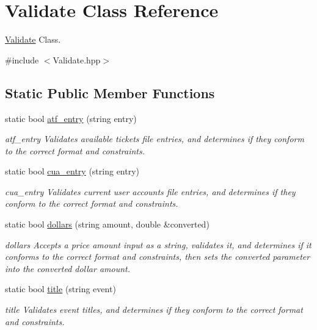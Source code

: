 \hypertarget{class_validate}{\section{Validate Class Reference}
\label{class_validate}
}


\hyperlink{class_validate}{Validate} Class.  




{\ttfamily \#include $<$Validate.\-hpp$>$}

\subsection*{Static Public Member Functions}
\begin{DoxyCompactItemize}
\item 
static bool \hyperlink{class_validate_a91df2ba52155e8442f2ce1461e2cdfdb}{atf\-\_\-entry} (string entry)
\begin{DoxyCompactList}\small\item\em atf\-\_\-entry Validates available tickets file entries, and determines if they conform to the correct format and constraints. \end{DoxyCompactList}\item 
static bool \hyperlink{class_validate_a765f4f7ccdcb748919594f228cbe106b}{cua\-\_\-entry} (string entry)
\begin{DoxyCompactList}\small\item\em cua\-\_\-entry Validates current user accounts file entries, and determines if they conform to the correct format and constraints. \end{DoxyCompactList}\item 
static bool \hyperlink{class_validate_a9e527b2f81d5fc890cadc2e50c113084}{dollars} (string amount, double \&converted)
\begin{DoxyCompactList}\small\item\em dollars Accepts a price amount input as a string, validates it, and determines if it conforms to the correct format and constraints, then sets the converted parameter into the converted dollar amount. \end{DoxyCompactList}\item 
static bool \hyperlink{class_validate_ad2f42f272981ad085addb2c142519317}{title} (string event)
\begin{DoxyCompactList}\small\item\em title Validates event titles, and determines if they conform to the correct format and constraints. \end{DoxyCompactList}\item 

\end{DoxyCompactItemize}
